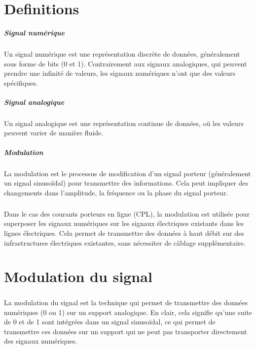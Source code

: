 \documentclass[a4paper,twocolumn]{report}
\begin{document}
\appendix
\chapter{Definitions}
\paragraph{Signal numérique} Un signal numérique est une représentation discrète de données, généralement sous forme de bits (0 et 1). Contrairement aux signaux analogiques, qui peuvent prendre une infinité de valeurs, les signaux numériques n'ont que des valeurs spécifiques.
\paragraph{Signal analogique} Un signal analogique est une représentation continue de données, où les valeurs peuvent varier de manière fluide.
\paragraph{Modulation} La modulation est le processus de modification d'un signal porteur (généralement un signal sinusoïdal) pour transmettre des informations. Cela peut impliquer des changements dans l'amplitude, la fréquence ou la phase du signal porteur.




\paragraph{}Dans le cas des courants porteurs en ligne (CPL), la modulation est utilisée pour superposer les signaux numériques sur les signaux électriques existants dans les lignes électriques. Cela permet de transmettre des données à haut débit sur des infrastructures électriques existantes, sans nécessiter de câblage supplémentaire.
\chapter{Modulation du signal}

\paragraph{}La modulation du signal est la technique qui permet de transmettre des données numériques (0 ou 1) sur un support analogique. En clair, cela signifie qu'une suite de 0 et de 1 sont intégrées dans un signal sinusoïdal, ce qui permet de transmettre ces données sur un support qui ne peut pas transporter directement des signaux numériques. 
\end{document}
